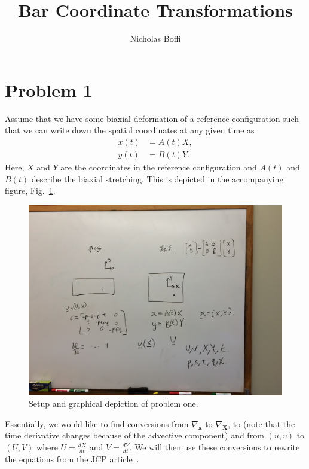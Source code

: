 \documentclass[11pt]{article}
\newcommand{\bX}{\mathbf{X}}
\newcommand{\bx}{\mathbf{x}}
\begin{document}
\title{Bar Coordinate Transformations}
\author{Nicholas Boffi}
\maketitle

\section*{Problem 1}
Assume that we have some biaxial deformation of a reference configuration such that we can write down the spatial coordinates at any given time as
\begin{align}
    x(t) &= A(t)X,\\
    y(t) &= B(t)Y.
    \label{eqn:coords}
\end{align}
Here, $X$ and $Y$ are the coordinates in the reference configuration and $A(t)$ and $B(t)$ describe the biaxial stretching. This is depicted in the accompanying figure, Fig.~\ref{fig:prob1}.
\begin{figure}
    \centering
    \includegraphics[width=\textwidth]{problem_1}
    \caption{Setup and graphical depiction of problem one.}
    \label{fig:prob1}
\end{figure}
Essentially, we would like to find conversions from $\nabla_\bx$ to $\nabla_\bX$,  to  (note that the time derivative changes because of the advective component) and from $(u, v)$ to $(U, V)$ where $U = \frac{d X}{dt}$ and $V = \frac{d Y}{dt}$. We will then use these conversions to rewrite the equations from the JCP article~\cite{rycroft15}.
\end{document}
